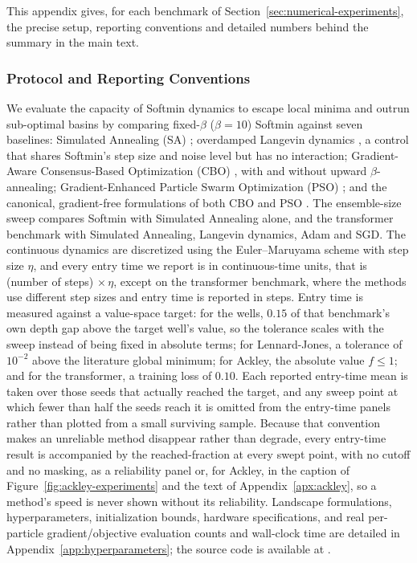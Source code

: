 \documentclass{article}
\theoremstyle{plain}
\theoremstyle{definition}
\theoremstyle{remark}
\begin{document}
This appendix gives, for each benchmark of Section~\ref{sec:numerical-experiments}, the precise
setup, reporting conventions and detailed numbers behind the summary in the main text.

\subsubsection{Protocol and Reporting Conventions}
\label{apx:protocol}

We evaluate the capacity of Softmin dynamics to escape local minima and outrun sub-optimal basins by comparing fixed-$\beta$ ($\beta=10$) Softmin against seven baselines: Simulated Annealing (SA) \cite{gelfand1990sampling}; overdamped Langevin dynamics \cite{welling2011bayesian}, a control that shares Softmin's step size and noise level but has no interaction; Gradient-Aware Consensus-Based Optimization (CBO) \cite{carrillo2021consensus}, with and without upward $\beta$-annealing; Gradient-Enhanced Particle Swarm Optimization (PSO) \cite{noel2012new}; and the canonical, gradient-free formulations of both CBO \cite{CarrilloChoiTotzeckTse2018, pinnau2017consensus} and PSO \cite{kennedy1995particle}. The ensemble-size sweep compares Softmin with Simulated Annealing alone, and the transformer benchmark with Simulated Annealing, Langevin dynamics, Adam and SGD. The continuous dynamics are discretized using the Euler--Maruyama scheme with step size $\eta$, and every entry time we report is in continuous-time units, that is (number of steps) $\times\,\eta$, except on the transformer benchmark, where the methods use different step sizes and entry time is reported in steps. Entry time is measured against a value-space target: for the wells, $0.15$ of that benchmark's own depth gap above the target well's value, so the tolerance scales with the sweep instead of being fixed in absolute terms; for Lennard-Jones, a tolerance of $10^{-2}$ above the literature global minimum; for Ackley, the absolute value $f\le1$; and for the transformer, a training loss of $0.10$. Each reported entry-time mean is taken over those seeds that actually reached the target, and any sweep point at which fewer than half the seeds reach it is omitted from the entry-time panels rather than plotted from a small surviving sample. Because that convention makes an unreliable method disappear rather than degrade, every entry-time result is accompanied by the reached-fraction at every swept point, with no cutoff and no masking, as a reliability panel or, for Ackley, in the caption of Figure~\ref{fig:ackley-experiments} and the text of Appendix~\ref{apx:ackley}, so a method's speed is never shown without its reliability. Landscape formulations, hyperparameters, initialization bounds, hardware specifications, and real per-particle gradient/objective evaluation counts and wall-clock time are detailed in Appendix~\ref{app:hyperparameters}; the source code is available at \cite{softmin_energy_2026}.
\end{document}
